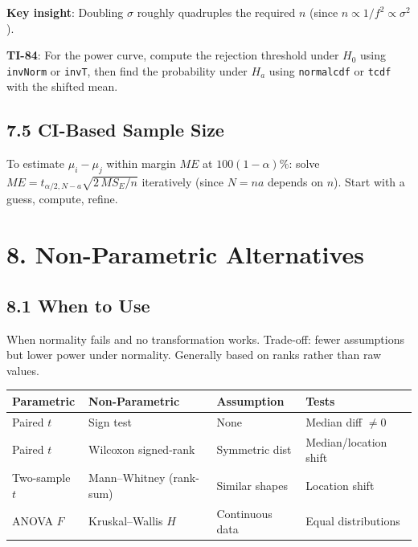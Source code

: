 \documentclass[9pt,letterpaper]{article}
\begin{document}
\textbf{Key insight}: Doubling $\sigma$ roughly quadruples the required $n$ (since $n \propto 1/f^2 \propto \sigma^2$).

\begin{calcbox}
\textbf{TI-84}: For the power curve, compute the rejection threshold under $H_0$ using \texttt{invNorm} or \texttt{invT}, then find the probability under $H_a$ using \texttt{normalcdf} or \texttt{tcdf} with the shifted mean.
\end{calcbox}

\subsection{7.5 CI-Based Sample Size}

To estimate $\mu_i-\mu_j$ within margin $ME$ at $100(1-\alpha)\%$: solve $ME = t_{\alpha/2,N-a}\sqrt{2\,MS_E/n}$ iteratively (since $N=na$ depends on $n$). Start with a guess, compute, refine.

\section{8. Non-Parametric Alternatives}

\subsection{8.1 When to Use}
When normality fails and no transformation works. Trade-off: fewer assumptions but lower power under normality. Generally based on ranks rather than raw values.

\begin{center}\small
\begin{tabular}{@{}llll@{}}
\toprule
Parametric & Non-Parametric & Assumption & Tests \\
\midrule
Paired $t$ & Sign test & None & Median diff $\ne 0$ \\
Paired $t$ & Wilcoxon signed-rank & Symmetric dist & Median/location shift \\
Two-sample $t$ & Mann--Whitney (rank-sum) & Similar shapes & Location shift \\
ANOVA $F$ & Kruskal--Wallis $H$ & Continuous data & Equal distributions \\
\bottomrule
\end{tabular}
\end{center}
\end{document}
